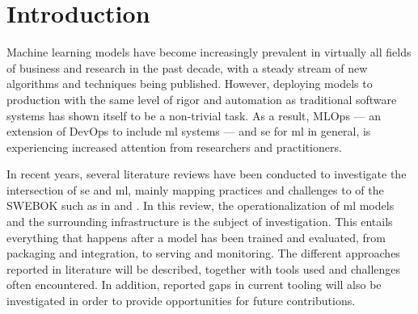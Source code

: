 \chapter{Introduction}
\label{ch:introduction}
Machine learning models have become increasingly prevalent in virtually all fields of business and research in the past decade, with a steady stream of new algorithms and techniques being published.
However, deploying models to production with the same level of rigor and automation as traditional software systems has shown itself to be a non-trivial task.
As a result, MLOps --- an extension of DevOps to include \acrfull{ml} systems --- and \acrfull{se} for \acrshort{ml} in general, is experiencing increased attention from researchers and practitioners.

In recent years, several literature reviews have been conducted to investigate the intersection of \acrshort{se} and \acrshort{ml}, mainly mapping practices and challenges to  of the SWEBOK \cite{Bourque2014} such as in \cite{Kumeno2020} and \cite{Nascimento2020}.
In this review, the operationalization of \acrshort{ml} models and the surrounding infrastructure is the subject of investigation.
This entails everything that happens after a model has been trained and evaluated, from packaging and integration, to serving and monitoring.
The different approaches reported in literature will be described, together with tools used and challenges often encountered.
In addition, reported gaps in current tooling will also be investigated in order to provide opportunities for future contributions.

